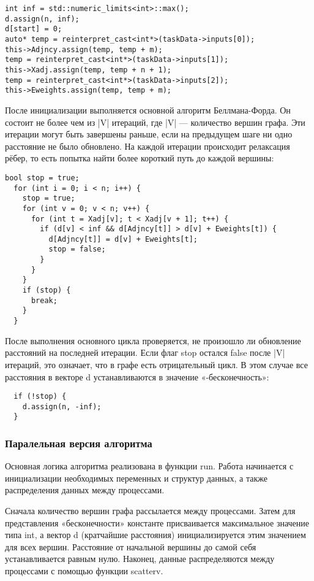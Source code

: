 \documentclass[a4paper, 14pt]{article}
\begin{document}
	\vspace{-1em}
	\begin{verbatim}
int inf = std::numeric_limits<int>::max();
d.assign(n, inf);
d[start] = 0;
auto* temp = reinterpret_cast<int*>(taskData->inputs[0]);
this->Adjncy.assign(temp, temp + m);
temp = reinterpret_cast<int*>(taskData->inputs[1]);
this->Xadj.assign(temp, temp + n + 1);
temp = reinterpret_cast<int*>(taskData->inputs[2]);
this->Eweights.assign(temp, temp + m);
	\end{verbatim}
  После инициализации выполняется основной алгоритм Беллмана-Форда. Он состоит не более чем из |V| итераций, где |V| — количество вершин графа. Эти итерации могут быть завершены раньше, если на предыдущем шаге ни одно расстояние не было обновлено. На каждой итерации происходит релаксация рёбер, то есть попытка найти более короткий путь до каждой вершины:
	\vspace{-1em}
	\begin{verbatim}
bool stop = true;
  for (int i = 0; i < n; i++) {
    stop = true;
    for (int v = 0; v < n; v++) {
      for (int t = Xadj[v]; t < Xadj[v + 1]; t++) {
        if (d[v] < inf && d[Adjncy[t]] > d[v] + Eweights[t]) {
          d[Adjncy[t]] = d[v] + Eweights[t];
          stop = false;
        }
      }
    }
    if (stop) {
      break;
    }
  }
	\end{verbatim}	
После выполнения основного цикла проверяется, не произошло ли обновление расстояний на последней итерации. Если флаг stop остался false после |V| итераций, это означает, что в графе есть отрицательный цикл. В этом случае все расстояния в векторе d устанавливаются в значение «-бесконечность»:
	\vspace{-1em}
	\begin{verbatim}
  if (!stop) {
    d.assign(n, -inf);
  }
	\end{verbatim}	


    
		\subsubsection*{\centering Паралельная версия алгоритма}
Основная логика алгоритма реализована в функции run. Работа начинается с инициализации необходимых переменных и структур данных, а также распределения данных между процессами.

Сначала количество вершин графа рассылается между процессами. Затем для представления «бесконечности» константе присваивается максимальное значение типа int, а вектор d (кратчайшие расстояния) инициализируется этим значением для всех вершин. Расстояние от начальной вершины до самой себя устанавливается равным нулю. Наконец, данные распределяются между процессами с помощью функции scatterv.
\end{document}
